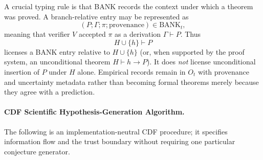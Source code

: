 \documentclass[11pt]{article}
\theoremstyle{definition}
\newcommand{\BANK}{\mathrm{BANK}}
\begin{document}
A crucial typing rule is that BANK records the context under which a theorem was proved. A branch-relative entry may be represented as
\[
(P;\Gamma;\pi;\text{provenance})\in\BANK_t,
\]
meaning that verifier $V$ accepted $\pi$ as a derivation $\Gamma\vdash P$. Thus
\[
H\cup\{h\}\vdash P
\]
licenses a BANK entry relative to $H\cup\{h\}$ (or, when supported by the proof system, an unconditional theorem $H\vdash h\to P$). It does \emph{not} license unconditional insertion of $P$ under $H$ alone. Empirical records remain in $O_t$ with provenance and uncertainty metadata rather than becoming formal theorems merely because they agree with a prediction.

\paragraph{CDF Scientific Hypothesis-Generation Algorithm.}
The following is an implementation-neutral CDF procedure; it specifies information flow and the trust boundary without requiring one particular conjecture generator.
\end{document}
